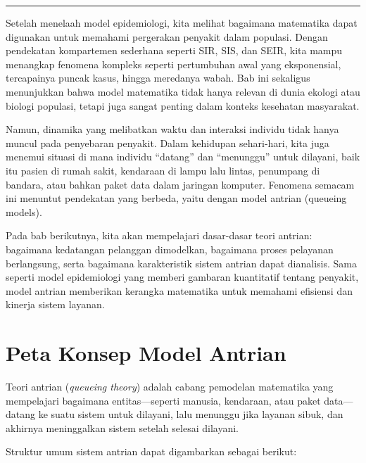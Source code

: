 \documentclass{bukumjh}
\begin{document}
\vspace{2em}
\hrule
\vspace{1em}


Setelah menelaah model epidemiologi, kita melihat bagaimana matematika dapat digunakan untuk memahami pergerakan penyakit dalam populasi. Dengan pendekatan kompartemen sederhana seperti SIR, SIS, dan SEIR, kita mampu menangkap fenomena kompleks seperti pertumbuhan awal yang eksponensial, tercapainya puncak kasus, hingga meredanya wabah. Bab ini sekaligus menunjukkan bahwa model matematika tidak hanya relevan di dunia ekologi atau biologi populasi, tetapi juga sangat penting dalam konteks kesehatan masyarakat.

Namun, dinamika yang melibatkan waktu dan interaksi individu tidak hanya muncul pada penyebaran penyakit. Dalam kehidupan sehari-hari, kita juga menemui situasi di mana {\jsg individu “datang” dan “menunggu” untuk dilayani}, baik itu pasien di rumah sakit, kendaraan di lampu lalu lintas, penumpang di bandara, atau bahkan paket data dalam jaringan komputer. Fenomena semacam ini menuntut pendekatan yang berbeda, yaitu dengan {\jsg model antrian (queueing models)}.

Pada bab berikutnya, kita akan mempelajari dasar-dasar teori antrian: bagaimana kedatangan pelanggan dimodelkan, bagaimana proses pelayanan berlangsung, serta bagaimana karakteristik sistem antrian dapat dianalisis. Sama seperti model epidemiologi yang memberi gambaran kuantitatif tentang penyakit, model antrian memberikan kerangka matematika untuk memahami efisiensi dan kinerja sistem layanan.


\section*{Peta Konsep Model Antrian}

Teori antrian (\textit{queueing theory}) adalah cabang pemodelan matematika yang mempelajari bagaimana entitas—seperti manusia, kendaraan, atau paket data—datang ke suatu sistem untuk dilayani, lalu menunggu jika layanan sibuk, dan akhirnya meninggalkan sistem setelah selesai dilayani.

Struktur umum sistem antrian dapat digambarkan sebagai berikut:
\end{document}
